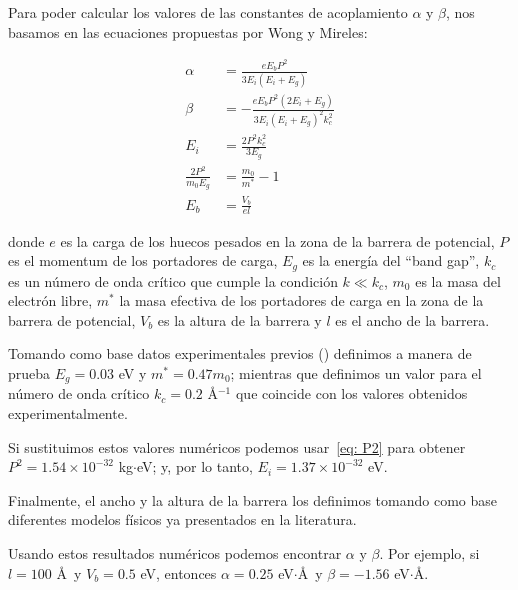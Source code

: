 Para poder calcular los valores de las constantes de acoplamiento $\alpha$ y $\beta$, nos basamos en las ecuaciones propuestas por Wong y Mireles\cite{WongUNAM2005}:

\begin{align}
    \alpha &= \frac{eE_b P^2}{3E_i\left( E_i + E_g \right)}\label{eq: alfa}\\
    \beta &= -\frac{eE_b P^2\left( 2E_i + E_g \right)}{3E_i\left( E_i + E_g \right)^2 k_c^2}\label{eq: beta}\\
    E_i &= \frac{2P^2 k_c^2}{3E_g} \label{eq: E_i}\\
    \frac{2P^2}{m_0 E_g} &= \frac{m_0}{m^*} - 1 \label{eq: P2}\\
    E_b &= \frac{V_b}{el} \label{eq: E_b}
\end{align}

\noindent donde $e$ es la carga de los huecos pesados en la zona de la barrera de potencial, $P$ es el momentum de los portadores de carga, $E_g$ es la energía del ``band gap'', $k_c$ es un número de onda crítico que cumple la condición $k \ll k_c$, $m_0$ es la masa del electrón libre, $m^*$ la masa efectiva de los portadores de carga en la zona de la barrera de potencial, $V_b$ es la altura de la barrera y $l$ es el ancho de la barrera.

Tomando como base datos experimentales previos (\cite{HuntSci2013, FuhrerSci2013, PallaBullMaterSci2016}) definimos a manera de prueba $E_g = 0.03$ eV y $m^* = 0.47m_0$; mientras que definimos un valor para el número de onda crítico $k_c = 0.2$ \AA$^{-1}$ que coincide con los valores obtenidos experimentalmente.

Si sustituimos estos valores numéricos podemos usar~\eqref{eq: P2} para obtener $P^2=1.54\times10^{-32}$ kg$\cdot$eV; y, por lo tanto, $E_i = 1.37\times10^{-32}$ eV.

Finalmente, el ancho y la altura de la barrera los definimos tomando como base diferentes modelos físicos ya presentados en la literatura.

Usando estos resultados numéricos podemos encontrar $\alpha$ y $\beta$.
Por ejemplo, si $l=100$ \AA\, y $V_b = 0.5$ eV, entonces $\alpha = 0.25$ eV$\cdot$\AA\, y $\beta = -1.56$ eV$\cdot$\AA.


